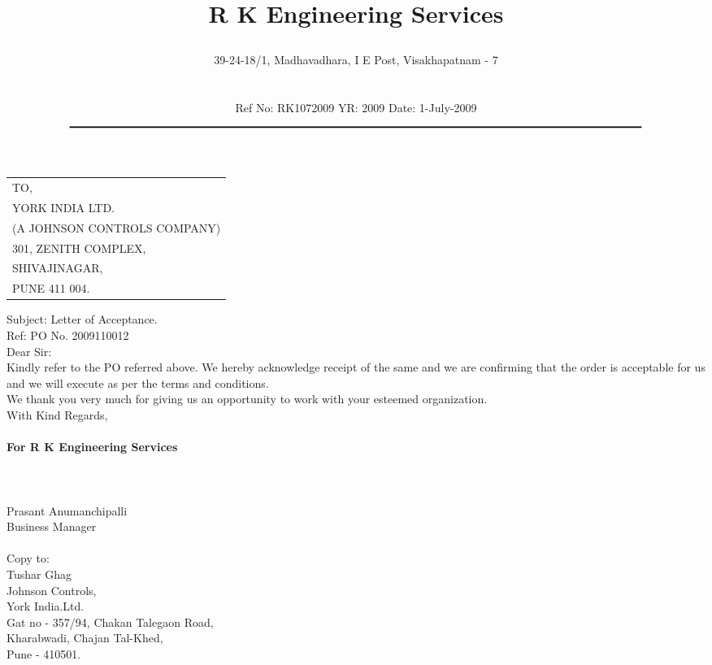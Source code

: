 \documentclass[11pt]{article}
\title{\vspace*{-1.5cm} \centerline{ {\Huge{ \bf \hspace{0cm} R K Engineering Services}\vspace*{-0.75cm}}}}
\author{\centerline {39-24-18/1, Madhavadhara, I E Post, Visakhapatnam - 7}\\ \\
 \scriptsize Ref No: RK1072009  \hspace*{4cm}   YR: 2009 \hspace*{4cm} Date: 1-July-2009\\
$\rule{7.0in}{0.5mm}$}
\date{}
\begin{document}
\maketitle
\thispagestyle{empty}
\vspace*{0.5cm}	
\begin{flushleft}
{\footnotesize
\begin{tabular}{l}
TO,\\
YORK INDIA LTD.\\
(A JOHNSON CONTROLS COMPANY)\\
301, ZENITH COMPLEX, \\
 SHIVAJINAGAR,\\
PUNE 411 004.
\end{tabular}
}
\end{flushleft}

\vspace*{0.5cm}
\large{
\noindent 
\noindent Subject: Letter of Acceptance.\\

\noindent Ref: PO No. 2009110012\\

\noindent Dear Sir:\\

 Kindly refer to the PO referred above. We hereby acknowledge receipt of the same and we are confirming that the order is acceptable for us and we will execute as per the terms and conditions.\\

We thank you very much for giving us an opportunity to work with your esteemed organization.\\

\vspace*{0.75cm}
\noindent With Kind Regards,\\\\
{\bf For  R K Engineering Services } \\ \\ \\ \\ 
 \noindent Prasant Anumanchipalli\\
 \noindent Business Manager\\\\

\noindent Copy to:\\
Tushar Ghag\\
Johnson Controls,\\
York India.Ltd.\\
Gat no - 357/94, Chakan Talegaon Road,\\
Kharabwadi, Chajan Tal-Khed,\\
Pune - 410501.
}
\end{document}
